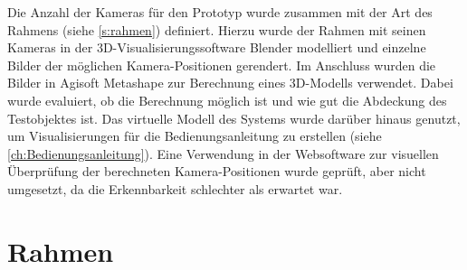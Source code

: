 \documentclass[./00PhotoBox.tex]{subfiles}
\begin{document}
Die Anzahl der Kameras für den Prototyp wurde zusammen mit der Art des Rahmens (siehe \autoref{s:rahmen}) definiert. Hierzu wurde der Rahmen mit seinen Kameras in der 3D-Visualisierungssoftware Blender modelliert und einzelne Bilder der möglichen Kamera-Positionen gerendert. Im Anschluss wurden die Bilder in Agisoft Metashape zur Berechnung eines 3D-Modells verwendet. Dabei wurde evaluiert, ob die Berechnung möglich ist und wie gut die Abdeckung des Testobjektes ist. Das virtuelle Modell des Systems wurde darüber hinaus genutzt, um Visualisierungen für die Bedienungsanleitung zu erstellen (siehe \autoref{ch:Bedienungsanleitung}). Eine Verwendung in der Websoftware zur visuellen Überprüfung der berechneten Kamera-Positionen wurde geprüft, aber nicht umgesetzt, da die Erkennbarkeit schlechter als erwartet war.

\section{Rahmen}
\label{s:rahmen}
\end{document}
